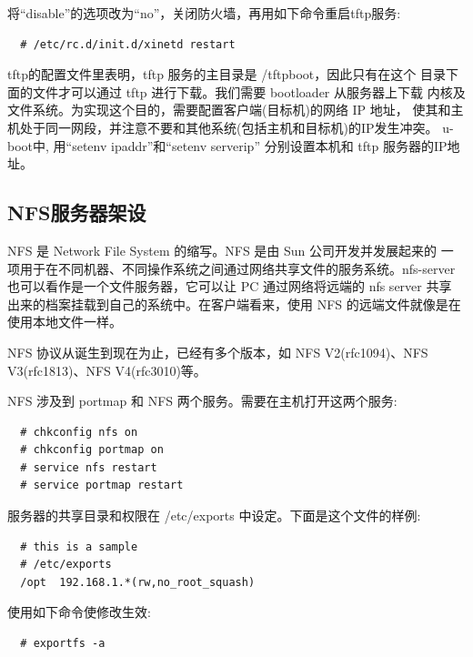     将``disable''的选项改为``no''，关闭防火墙，再用如下命令重启tftp服务:

\begin{boxedminipage}{.9\textwidth}
\begin{verbatim}
  # /etc/rc.d/init.d/xinetd restart
\end{verbatim}
\end{boxedminipage}

	tftp的配置文件里表明，tftp 服务的主目录是 /tftpboot，因此只有在这个
目录下面的文件才可以通过 tftp 进行下载。我们需要 bootloader 从服务器上下载
内核及文件系统。为实现这个目的，需要配置客户端(目标机)的网络 IP 地址，
使其和主机处于同一网段，并注意不要和其他系统(包括主机和目标机)的IP发生冲突。
u-boot中, 用``setenv ipaddr''和``setenv serverip'' 分别设置本机和 tftp
服务器的IP地址。

\subsection{NFS服务器架设}
      NFS 是 Network File System 的缩写。NFS 是由 Sun 公司开发并发展起来的
一项用于在不同机器、不同操作系统之间通过网络共享文件的服务系统。nfs-server
也可以看作是一个文件服务器，它可以让 PC 通过网络将远端的 nfs server 共享
出来的档案挂载到自己的系统中。在客户端看来，使用 NFS 的远端文件就像是在
使用本地文件一样。

    NFS 协议从诞生到现在为止，已经有多个版本，如 NFS V2(rfc1094)、NFS
V3(rfc1813)、NFS V4(rfc3010)等。

    NFS 涉及到 portmap 和 NFS 两个服务。需要在主机打开这两个服务:

\begin{boxedminipage}{.9\textwidth}
\begin{verbatim}
  # chkconfig nfs on
  # chkconfig portmap on
  # service nfs restart
  # service portmap restart
\end{verbatim}
\end{boxedminipage}

服务器的共享目录和权限在 /etc/exports 中设定。下面是这个文件的样例:

\begin{boxedminipage}{.9\textwidth}
\begin{verbatim}
  # this is a sample
  # /etc/exports
  /opt  192.168.1.*(rw,no_root_squash)
\end{verbatim}
\end{boxedminipage}

使用如下命令使修改生效:

\begin{boxedminipage}{.9\textwidth}
\begin{verbatim}
  # exportfs -a
\end{verbatim}
\end{boxedminipage}

